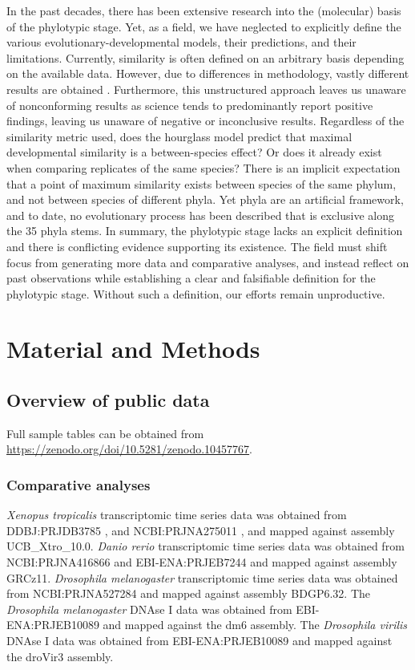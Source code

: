 In the past decades, there has been extensive research into the (molecular) basis of the phylotypic stage. Yet, as a field, we have neglected to explicitly define the various evolutionary-developmental models, their predictions, and their limitations. Currently, similarity is often defined on an arbitrary basis depending on the available data. However, due to differences in methodology, vastly different results are obtained  \cite{Piasecka2013,Dunn2018,Chan2021}. Furthermore, this unstructured approach leaves us unaware of nonconforming results as science tends to predominantly report positive findings, leaving us unaware of negative or inconclusive results. Regardless of the similarity metric used, does the hourglass model predict that maximal developmental similarity is a between-species effect? Or does it already exist when comparing replicates of the same species? There is an implicit expectation that a point of maximum similarity exists between species of the same phylum, and not between species of different phyla. Yet phyla are an artificial framework, and to date, no evolutionary process has been described that is exclusive along the 35 phyla stems\cite{hejnol2016}. In summary, the phylotypic stage lacks an explicit definition and there is conflicting evidence supporting its existence. The field must shift focus from generating more data and comparative analyses, and instead reflect on past observations while establishing a clear and falsifiable definition for the phylotypic stage. Without such a definition, our efforts remain unproductive.

\section{Material and Methods}

\subsection{Overview of public data}

Full sample tables can be obtained from \url{https://zenodo.org/doi/10.5281/zenodo.10457767}.

\subsubsection{Comparative analyses}

\textit{Xenopus tropicalis} transcriptomic time series data was obtained from DDBJ:PRJDB3785 \cite{Hu2017}, and NCBI:PRJNA275011 \cite{Owens2016}, and mapped against assembly UCB\_Xtro\_10.0. \textit{Danio rerio} transcriptomic time series data was obtained from NCBI:PRJNA416866 \cite{marletaz2018} and EBI-ENA:PRJEB7244 \cite{White2017} and mapped against assembly GRCz11. \textit{Drosophila melanogaster} transcriptomic time series data was obtained from NCBI:PRJNA527284 \cite{Liu2021} and mapped against assembly BDGP6.32. The \textit{Drosophila melanogaster} DNAse I data was obtained from EBI-ENA:PRJEB10089 \cite{Liu2020} and mapped against the dm6 assembly. The \textit{Drosophila virilis} DNAse I data was obtained from EBI-ENA:PRJEB10089 \cite{Liu2020} and mapped against the droVir3 assembly.


